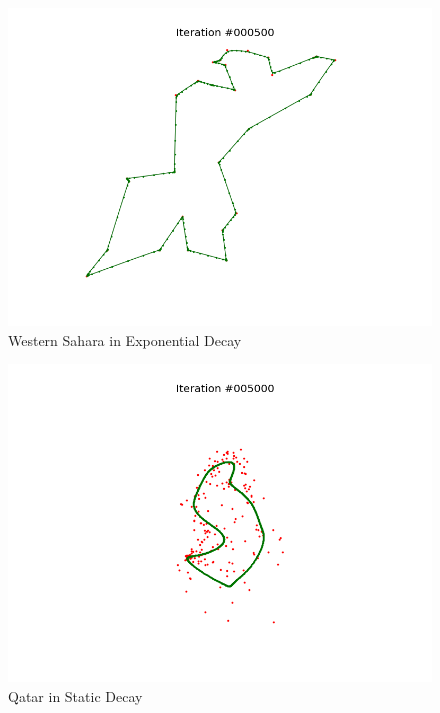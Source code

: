 \documentclass[11pt]{article}
\begin{document}
\begin{figure}[!ht]
  \centering
  \includegraphics[scale=0.6]{w_e.png}
  \caption{Western Sahara in Exponential Decay}
\end{figure}


\begin{figure}[!ht]
  \centering
  \includegraphics[scale=0.6]{q_s.png}
  \caption{Qatar in Static Decay}
\end{figure}
\end{document}
